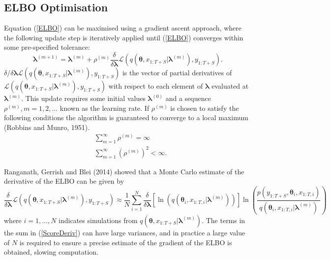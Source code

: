 \documentclass[12pt,a4paper]{article}%
\numberwithin{equation}{section}
\begin{document}
\subsection{ELBO Optimisation}
Equation (\ref{ELBO}) can be maximised using a gradient ascent approach, where the following update step is iteratively applied until (\ref{ELBO}) converges within some pre-specified tolerance:
\begin{equation}
\label{GradAscent}
\boldsymbol{\lambda}^{(m+1)} = \boldsymbol{\lambda}^{(m)} + \rho^{(m)} \frac{\delta}{\delta\boldsymbol{\lambda}} \mathcal{L}(q(\boldsymbol{\theta}, x_{1:T+S} | \boldsymbol{\lambda}^{(m)}), y_{1:T+S}).
\end{equation}
$\delta/\delta\boldsymbol{\lambda}\mathcal{L}(q(\boldsymbol{\theta}, x_{1:T+S} | \boldsymbol{\lambda}^{(m)}), y_{1:T+S})$ is the vector of partial derivatives of $\mathcal{L}(q(\boldsymbol{\theta}, x_{1:T+S} | \boldsymbol{\lambda}^{(m)}), y_{1:T+S})$ with respect to each element of $\boldsymbol{\lambda}$ evaluated at $\boldsymbol{\lambda}^{(m)}$. This update requires some initial values $\boldsymbol{\lambda}^{(0)}$ and a sequence $\rho^{(m)}, m = 1, 2, \dots$ known as the learning rate. If $\rho^{(m)}$ is chosen to satisfy the following conditions the algorithm is guaranteed to converge to a local maximum (Robbins and Munro, 1951).
\begin{align}
&\sum_{m=1}^{\infty} \rho^{(m)} =  \infty \\
&\sum_{m=1}^{\infty} (\rho^{(m)})^2 <  \infty.
\end{align}

Ranganath, Gerrish and Blei (2014) showed that a Monte Carlo estimate of the derivative of the ELBO can be given by
\begin{equation}
\label{ScoreDeriv}
\frac{\delta}{\delta\boldsymbol{\lambda}}\mathcal{L}(q(\boldsymbol{\theta}, x_{1:T+S} | \boldsymbol{\lambda}^{(m)}), y_{1:T+S}) \approx \frac{1}{N}\sum_{i=1}^{N} \frac{\delta}{\delta\boldsymbol{\lambda}} [\ln(q(\boldsymbol{\theta}_i, x_{1:T, i} | \boldsymbol{\lambda}^{(m)}))] \ln \left(\frac{p(y_{1:T+S}, \boldsymbol{\theta}_i, x_{1:T, i})}{q(\boldsymbol{\theta}_i, x_{1:T, i} | \boldsymbol{\lambda}^{(m)})} \right) 
\end{equation}
where $i = 1, \dots, N$ indicates simulations from $q(\boldsymbol{\theta}, x_{1:T+S} | \boldsymbol{\lambda}^{(m)})$. 
The terms in the sum in (\ref{ScoreDeriv}) can have large variances, and in practice a large value of $N$ is required to ensure a precise estimate of the gradient of the ELBO is obtained, slowing computation. 
\end{document}
